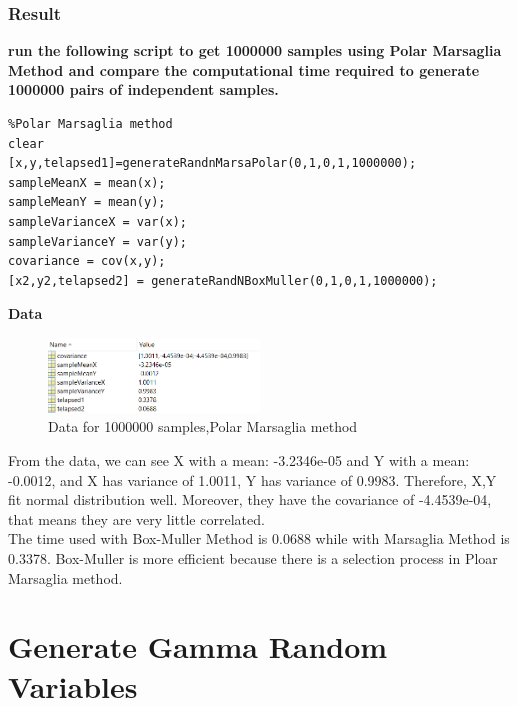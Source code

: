 \documentclass[twoside]{article}
\begin{document}
\begin{multicols*}{2}
\subsubsection{Result}
\noindent \textbf {run the following script to get 1000000 samples using Polar Marsaglia Method and compare the computational time required to generate 1000000 pairs of independent samples.}\\
\begin{lstlisting}
%Polar Marsaglia method
clear
[x,y,telapsed1]=generateRandnMarsaPolar(0,1,0,1,1000000);  
sampleMeanX = mean(x);
sampleMeanY = mean(y);
sampleVarianceX = var(x);
sampleVarianceY = var(y);
covariance = cov(x,y);
[x2,y2,telapsed2] = generateRandNBoxMuller(0,1,0,1,1000000);
\end{lstlisting}
\noindent \textbf {Data}\\
\begin{figure}[H]
   \centering
   \includegraphics[width = 0.5\textwidth]{../data/solution1result2.png}  
   \caption{Data for 1000000 samples,Polar Marsaglia method}
\end{figure}
From the data, we can see X with a mean: -3.2346e-05 and Y with a mean: -0.0012, and X has variance of 1.0011, Y has variance of  0.9983. Therefore, X,Y fit normal distribution well. Moreover, they have the covariance of -4.4539e-04, that means they are very little correlated. \\
The time used with Box-Muller Method is 0.0688 while with Marsaglia Method is 0.3378. Box-Muller is more efficient because there is a selection process in Ploar Marsaglia method. \\

\section{Generate Gamma Random Variables}

\end{multicols*}
\end{document}
